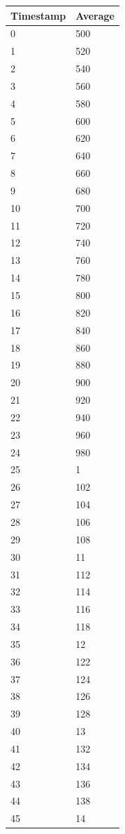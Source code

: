 %
%
\begin{tabular}{|l||l|}
\hline
	\textbf{Timestamp} & \textbf{Average} \\ \hline
	0 & 500 \\ \hline
	1 & 520 \\ \hline
	2 & 540 \\ \hline
	3 & 560 \\ \hline
	4 & 580 \\ \hline
	5 & 600 \\ \hline
	6 & 620 \\ \hline
	7 & 640 \\ \hline
	8 & 660 \\ \hline
	9 & 680 \\ \hline
	10 & 700 \\ \hline
	11 & 720 \\ \hline
	12 & 740 \\ \hline
	13 & 760 \\ \hline
	14 & 780 \\ \hline
	15 & 800 \\ \hline
	16 & 820 \\ \hline
	17 & 840 \\ \hline
	18 & 860 \\ \hline
	19 & 880 \\ \hline
	20 & 900 \\ \hline
	21 & 920 \\ \hline
	22 & 940 \\ \hline
	23 & 960 \\ \hline
	24 & 980 \\ \hline
	25 & 1 \\ \hline
	26 & 102 \\ \hline
	27 & 104 \\ \hline
	28 & 106 \\ \hline
	29 & 108 \\ \hline
	30 & 11 \\ \hline
	31 & 112 \\ \hline
	32 & 114 \\ \hline
	33 & 116 \\ \hline
	34 & 118 \\ \hline
	35 & 12 \\ \hline
	36 & 122 \\ \hline
	37 & 124 \\ \hline
	38 & 126 \\ \hline
	39 & 128 \\ \hline
	40 & 13 \\ \hline
	41 & 132 \\ \hline
	42 & 134 \\ \hline
	43 & 136 \\ \hline
	44 & 138 \\ \hline
	45 & 14 \\ \hline
\end{tabular}
